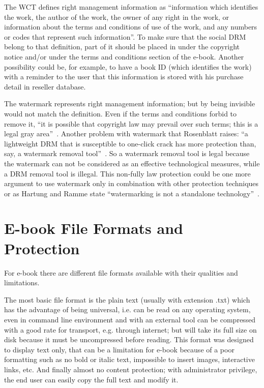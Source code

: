 \documentclass[11pt,a4paper,oneside]{memoir}
\begin{document}
The WCT \cite[article 12(2)]{wipo:wct} defines right management information as \textquotedblleft information which identifies the work, the author of the work, the owner of any right in the work, or information about the terms and conditions of use of the work, and any numbers or codes that represent such information\textquotedblright . To make sure that the social DRM belong to that definition, part of it should be placed in under the copyright notice and/or under the terms and conditions section of the e-book. Another possibility could be, for example, to have a book ID (which identifies the work) with a reminder to the user that this information is stored with his purchase detail in reseller database. 

The watermark represents right management information; but by being invisible would not match the definition. Even if the terms and conditions forbid to remove it, \textquotedblleft it is possible that copyright law may prevail over such terms; this is a legal gray area\textquotedblright ~\cite{rosenblatt:pottermore}. Another problem with watermark that Rosenblatt raises: \textquotedblleft a lightweight DRM that is susceptible to one-click crack has more protection than, say, a watermark removal tool\textquotedblright ~\cite{idpf:lcp-uc}. So a watermark removal tool is legal  because the watermark can not be considered as an effective technological measures, while a DRM removal tool is illegal. This non-fully law protection could be one more argument to use watermark only in combination with other protection techniques or as Hartung and Ramme state \textquotedblleft watermarking is not a standalone technology\textquotedblright ~\cite{ieee:drm_watermark}. 


\chapter{E-book File Formats and Protection}

For e-book there are different file formats available with their qualities and limitations.


The most basic file format is the plain text (usually with extension .txt) which has the advantage of being universal, i.e. can be read on any operating system, even in command line environment and with an external tool can be compressed with a good rate for transport, e.g. through internet; but will take its full size on disk because it must be uncompressed before reading. This format was designed to display text only, that can be a limitation for e-book because of a poor formatting such as no bold or italic text, impossible to insert images, interactive links, etc. And finally almost no content protection; with administrator privilege, the end user can easily copy the full text and modify it.
\end{document}
